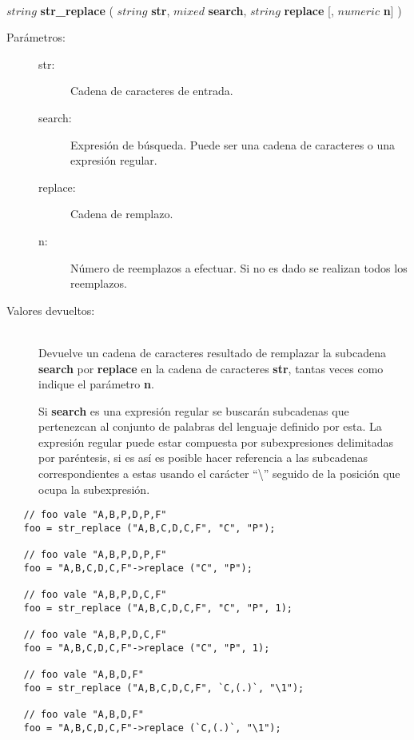 \begin{framed}
\hfill \\ $string$ \textbf{str\_replace} ( $string$ \textbf{str}, $mixed$ \textbf{search}, $string$ \textbf{replace} [, $numeric$ \textbf{n}] )  
\begin{description}
\item [Parámetros:] \hfill 
   \begin{description}
   \item[str:] Cadena de caracteres de entrada.
   \item[search:] Expresión de búsqueda. Puede ser una cadena de caracteres o una expresión regular.  
   \item[replace:] Cadena de remplazo.
   \item[n:] Número de reemplazos a efectuar. Si no es dado se realizan todos los reemplazos.
   \end{description}
\item[Valores devueltos:] \hfill \\
   Devuelve un cadena de caracteres resultado de remplazar la subcadena \textbf{search}  por \textbf{replace}
   en la cadena de caracteres \textbf{str}, tantas veces como indique el parámetro \textbf{n}.
   
   Si \textbf{search} es una expresión regular se buscarán subcadenas que pertenezcan al conjunto de palabras del lenguaje definido por esta. La
   expresión regular puede estar compuesta por subexpresiones delimitadas por paréntesis, si es así es posible hacer referencia a las subcadenas 
   correspondientes a estas usando el carácter ``\textbackslash'' seguido de la posición que ocupa la subexpresión.
   
\end{description}
\end{framed}


\begin{lstlisting}
   // foo vale "A,B,P,D,P,F" 
   foo = str_replace ("A,B,C,D,C,F", "C", "P"); 
   
   // foo vale "A,B,P,D,P,F" 
   foo = "A,B,C,D,C,F"->replace ("C", "P");

   // foo vale "A,B,P,D,C,F" 
   foo = str_replace ("A,B,C,D,C,F", "C", "P", 1); 
   
   // foo vale "A,B,P,D,C,F" 
   foo = "A,B,C,D,C,F"->replace ("C", "P", 1);

   // foo vale "A,B,D,F" 
   foo = str_replace ("A,B,C,D,C,F", `C,(.)`, "\1"); 
   
   // foo vale "A,B,D,F" 
   foo = "A,B,C,D,C,F"->replace (`C,(.)`, "\1");
\end{lstlisting}

